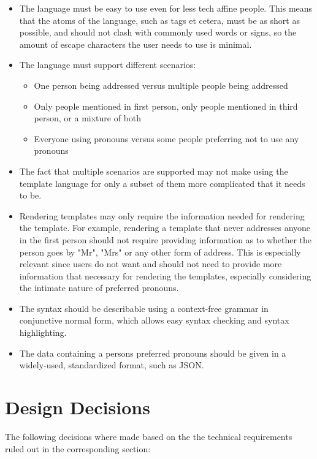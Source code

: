 \documentclass{article}
\begin{document}
    \begin{itemize}
        \item The language must be easy to use even for less tech affine people.
              This means that the atoms of the language, such as tags et cetera, must be as short as possible, and should not clash with commonly used words or signs, so the amount of escape characters the user needs to use is minimal.
        \item The language must support different scenarios:
        \begin{itemize}
            \item One person being addressed versus multiple people being addressed
            \item Only people mentioned in first person, only people mentioned in third person, or a mixture of both
            \item Everyone using pronouns versus some people preferring not to use any pronouns
        \end{itemize}
        \item The fact that multiple scenarios are supported may not make using the template language for only a subset of them more complicated that it needs to be.
        \item Rendering templates may only require the information needed for rendering the template.
        For example, rendering a template that never addresses anyone in the first person should not require providing information as to whether the person goes by "Mr", "Mrs" or any other form of address.
        This is especially relevant since users do not want and should not need to provide more information that necessary for rendering the templates, especially considering the intimate nature of preferred pronouns.
        \item The syntax should be describable using a context-free grammar in conjunctive normal form, which allows easy syntax checking and syntax highlighting.
        \item The data containing a persons preferred pronouns should be given in a widely-used, standardized format, such as JSON.
    \end{itemize}

\section{Design Decisions}

    The following decisions where made based on the the technical requirements ruled out in the corresponding section:
\end{document}
